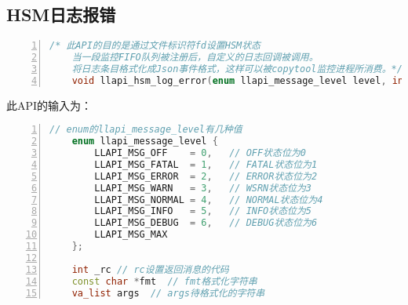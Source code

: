 \subsection{HSM日志报错}

\begin{lstlisting}[language={c++},numbers=left]
    /* 此API的目的是通过文件标识符fd设置HSM状态
    当一段监控FIFO队列被注册后，自定义的日志回调被调用。
    将日志条目格式化成Json事件格式，这样可以被copytool监控进程所消费。*/
    void llapi_hsm_log_error(enum llapi_message_level level, int _rc, const char *fmt, va_list args);
\end{lstlisting}
此API的输入为：
\begin{lstlisting}[language={c++},numbers=left]
    // enum的llapi_message_level有几种值
    enum llapi_message_level {
        LLAPI_MSG_OFF    = 0,   // OFF状态位为0
        LLAPI_MSG_FATAL  = 1,   // FATAL状态位为1
        LLAPI_MSG_ERROR  = 2,   // ERROR状态位为2
        LLAPI_MSG_WARN   = 3,   // WSRN状态位为3
        LLAPI_MSG_NORMAL = 4,   // NORMAL状态位为4
        LLAPI_MSG_INFO   = 5,   // INFO状态位为5
        LLAPI_MSG_DEBUG  = 6,   // DEBUG状态位为6
        LLAPI_MSG_MAX
    };

    int _rc // rc设置返回消息的代码
    const char *fmt  // fmt格式化字符串
    va_list args  // args待格式化的字符串
\end{lstlisting}

